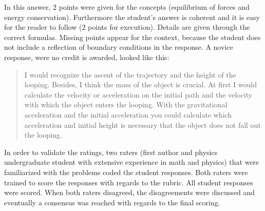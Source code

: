 \documentclass[D:/studies/WinnerS/Erhebungen/IPhO1718/paper/problem_solving/main/TaylorFrancis/interactapasample]{subfiles}
\begin{document}
In this answer, $2$ points were given for the concepts (equilibrium of forces and energy conservation). Furthermore the student's answer is coherent and it is easy for the reader to follow ($2$ points for execution). Details are given through the correct formulas. Missing points appear for the context, because the student does not include a reflection of boundary conditions in the response. A novice response, were no credit is awarded, looked like this:
\begin{quote}
I would recognize the ascent of the trajectory and the height of the looping. Besides, I think the mass of the object is crucial. At first I would calculate the velocity or acceleration on the initial path and the velocity with which the object enters the looping. With the gravitational acceleration and the initial acceleration you could calculate which acceleration and initial height is necessary that the object does not fall out the looping.

\end{quote}

In order to validate the ratings, two raters (first author and physics undergraduate student with extensive experience in math and physics) that were familiarized with the problems coded the student responses. Both raters were trained to score the responses with regards to the rubric. All student responses were scored. When both raters disagreed, the disagreements were discussed and eventually a consensus was reached with regards to the final scoring.
\end{document}
